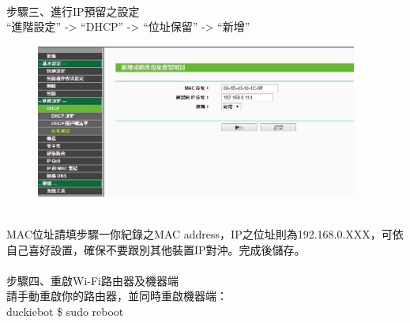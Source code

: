 \documentclass{article}
\begin{document}
\\步驟三、進行IP預留之設定
\\“進階設定” -> “DHCP” -> “位址保留” -> “新增”
\begin{figure}[htp]
    \begin{center}
        \includegraphics[width=300pt]{pic/圖片15.jpg}
    \end{center}
\end{figure}
\\MAC位址請填步驟一你紀錄之MAC address，IP之位址則為192.168.0.XXX，可依自己喜好設置，確保不要跟別其他裝置IP對沖。完成後儲存。
\\
\\步驟四、重啟Wi-Fi路由器及機器端
\\請手動重啟你的路由器，並同時重啟機器端：
\\duckiebot \$ sudo reboot
\end{document}

